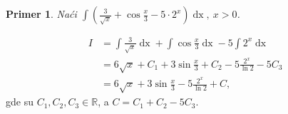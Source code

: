 \documentclass{article}
\newtheorem{prim}{Primer}[section]
\DeclareMathOperator{\dx}{dx}
\begin{document}
\begin{primbox}
    \label{primer_1.6}
    \begin{prim}
        Naći $\displaystyle\int \left(\frac{3}{\sqrt{x}} +
            \cos\frac{x}{3} - 5\cdot 2^x\right)\dx,\ x > 0$.
    \end{prim}
    \begin{align*}
        I & = \int\frac{3}{\sqrt{x}} \dx + \int \cos\frac{x}{3} \dx - 5\int 2^x \dx
        \\ & = 6\sqrt{x} + C_1 + 3\sin\frac{x}{3} + C_2 - 5\frac{2^x}{\ln{2}} - 5C_3
        \\ & = 6\sqrt{x} + 3\sin\frac{x}{3} - 5\frac{2^x}{\ln{2}} + C,
    \end{align*}
    gde su $C_1,C_2,C_3\in\mathbb{R}$, a $C=C_1+C_2-5C_3$.
\end{primbox}
\end{document}
